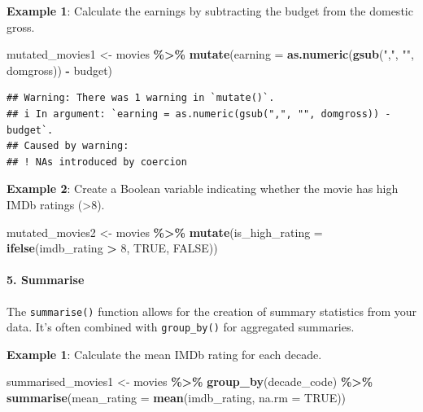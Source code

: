 \documentclass[
  b5paper]{book}
\newenvironment{Shaded}{\begin{snugshade}}{\end{snugshade}}
\newcommand{\AttributeTok}[1]{\textcolor[rgb]{0.13,0.29,0.53}{#1}}
\newcommand{\ConstantTok}[1]{\textcolor[rgb]{0.56,0.35,0.01}{#1}}
\newcommand{\DecValTok}[1]{\textcolor[rgb]{0.00,0.00,0.81}{#1}}
\newcommand{\FunctionTok}[1]{\textcolor[rgb]{0.13,0.29,0.53}{\textbf{#1}}}
\newcommand{\NormalTok}[1]{#1}
\newcommand{\OtherTok}[1]{\textcolor[rgb]{0.56,0.35,0.01}{#1}}
\newcommand{\SpecialCharTok}[1]{\textcolor[rgb]{0.81,0.36,0.00}{\textbf{#1}}}
\newcommand{\StringTok}[1]{\textcolor[rgb]{0.31,0.60,0.02}{#1}}
\begin{document}
\textbf{Example 1}: Calculate the earnings by subtracting the budget from the domestic gross.

\begin{Shaded}
\begin{Highlighting}[]
\NormalTok{mutated\_movies1 }\OtherTok{\textless{}{-}}\NormalTok{ movies }\SpecialCharTok{\%\textgreater{}\%}
  \FunctionTok{mutate}\NormalTok{(}\AttributeTok{earning =} \FunctionTok{as.numeric}\NormalTok{(}\FunctionTok{gsub}\NormalTok{(}\StringTok{","}\NormalTok{, }\StringTok{""}\NormalTok{, domgross)) }\SpecialCharTok{{-}}\NormalTok{ budget)}
\end{Highlighting}
\end{Shaded}

\begin{verbatim}
## Warning: There was 1 warning in `mutate()`.
## i In argument: `earning = as.numeric(gsub(",", "", domgross)) - budget`.
## Caused by warning:
## ! NAs introduced by coercion
\end{verbatim}

\textbf{Example 2}: Create a Boolean variable indicating whether the movie has high IMDb ratings (\textgreater8).

\begin{Shaded}
\begin{Highlighting}[]
\NormalTok{mutated\_movies2 }\OtherTok{\textless{}{-}}\NormalTok{ movies }\SpecialCharTok{\%\textgreater{}\%}
  \FunctionTok{mutate}\NormalTok{(}\AttributeTok{is\_high\_rating =} \FunctionTok{ifelse}\NormalTok{(imdb\_rating }\SpecialCharTok{\textgreater{}} \DecValTok{8}\NormalTok{, }\ConstantTok{TRUE}\NormalTok{, }\ConstantTok{FALSE}\NormalTok{))}
\end{Highlighting}
\end{Shaded}

\hypertarget{summarise}{%
\paragraph*{5. Summarise}\label{summarise}}

The \texttt{summarise()} function allows for the creation of summary statistics from your data. It's often combined with \texttt{group\_by()} for aggregated summaries.

\textbf{Example 1}: Calculate the mean IMDb rating for each decade.

\begin{Shaded}
\begin{Highlighting}[]
\NormalTok{summarised\_movies1 }\OtherTok{\textless{}{-}}\NormalTok{ movies }\SpecialCharTok{\%\textgreater{}\%}
  \FunctionTok{group\_by}\NormalTok{(decade\_code) }\SpecialCharTok{\%\textgreater{}\%}
  \FunctionTok{summarise}\NormalTok{(}\AttributeTok{mean\_rating =} \FunctionTok{mean}\NormalTok{(imdb\_rating, }\AttributeTok{na.rm =} \ConstantTok{TRUE}\NormalTok{))}
\end{Highlighting}
\end{Shaded}
\end{document}
